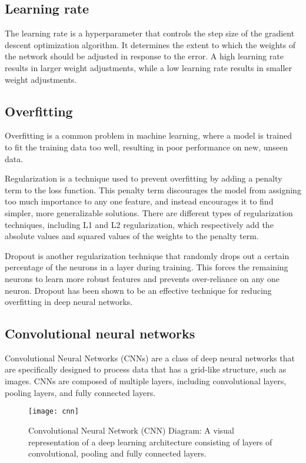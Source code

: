 \subsection{Learning rate}
The learning rate is a hyperparameter that controls the step size of the gradient descent optimization algorithm.
It determines the extent to which the weights of the network should be adjusted in response to the error.
A high learning rate results in larger weight adjustments, while a low learning rate results in smaller weight adjustments.

\subsection{Overfitting}
Overfitting is a common problem in machine learning, where a model is trained to fit the training data too well, resulting in poor performance on new, unseen data.

Regularization is a technique used to prevent overfitting by adding a penalty term to the loss function.
This penalty term discourages the model from assigning too much importance to any one feature, and instead encourages it to find simpler, more generalizable solutions.
There are different types of regularization techniques, including L1 and L2 regularization, which respectively add the absolute values and squared values of the weights to the penalty term.

Dropout is another regularization technique that randomly drops out a certain percentage of the neurons in a layer during training. 
This forces the remaining neurons to learn more robust features and prevents over-reliance on any one neuron. 
Dropout has been shown to be an effective technique for reducing overfitting in deep neural networks.



\subsection{Convolutional neural networks}
Convolutional Neural Networks (CNNs) \cite{goodfellow2016deep} are a class of deep neural networks that are specifically designed to process data that has a grid-like structure, such as images.
CNNs are composed of multiple layers, including convolutional layers, pooling layers, and fully connected layers.


\begin{figure}[H]
  \centering
  \texttt{[image: cnn]}
  \caption{Convolutional Neural Network (CNN) Diagram: A visual representation of a deep learning architecture consisting of layers of convolutional, pooling and fully connected layers. \cite{shah}}
\end{figure}

